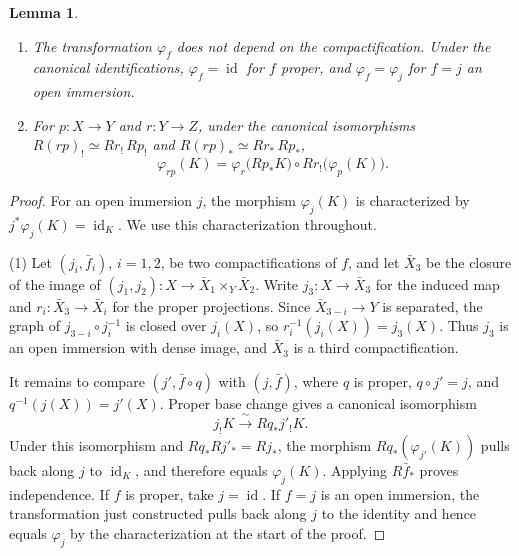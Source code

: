 \documentclass[12pt,reqno]{amsart}
\theoremstyle{definition}
\theoremstyle{plain}
\newtheorem{lem}[para]{Lemma}
\theoremstyle{definition}
\theoremstyle{remark}
\begin{document}
\begin{lem}
\label{lem:forget-supports}
\begin{enumerate}
\item The transformation \(\varphi_f\) does not depend on the compactification.  Under the canonical
identifications, \(\varphi_f=\operatorname{id}\) for \(f\) proper, and \(\varphi_f=\varphi_j\) for \(f=j\)
an open immersion.
\item For \(p\colon X\to Y\) and \(r\colon Y\to Z\), under the canonical isomorphisms
\(R(rp)_!\simeq Rr_!\,Rp_!\) and \(R(rp)_*\simeq Rr_*\,Rp_*\),
\[
        \varphi_{rp}(K)=\varphi_r\bigl(Rp_*K\bigr)\circ Rr_!\bigl(\varphi_p(K)\bigr).
\]
\end{enumerate}
\end{lem}

\begin{proof}
For an open immersion \(j\), the morphism \(\varphi_j(K)\) is characterized by
\(j^*\varphi_j(K)=\operatorname{id}_K\).  We use this characterization throughout.

(1)  Let \((j_i,\bar f_i)\), \(i=1,2\), be two compactifications of \(f\), and let \(\bar X_3\) be the
closure of the image of \((j_1,j_2)\colon X\to\bar X_1\times_Y\bar X_2\).  Write
\(j_3\colon X\to\bar X_3\) for the induced map and \(r_i\colon\bar X_3\to\bar X_i\) for the proper
projections.  Since \(\bar X_{3-i}\to Y\) is separated, the graph of
\(j_{3-i}\circ j_i^{-1}\) is closed over \(j_i(X)\), so
\(r_i^{-1}(j_i(X))=j_3(X)\).  Thus \(j_3\) is an open immersion with dense image, and \(\bar X_3\) is a
third compactification.

It remains to compare \((j',\bar f\circ q)\) with \((j,\bar f)\), where \(q\) is proper,
\(q\circ j'=j\), and \(q^{-1}(j(X))=j'(X)\).  Proper base change gives a canonical isomorphism
\[
        j_!K\xrightarrow{\ \sim\ }Rq_*j'_!K.
\]
Under this isomorphism and \(Rq_*Rj'_*=Rj_*\), the morphism \(Rq_*(\varphi_{j'}(K))\) pulls back along
\(j\) to \(\operatorname{id}_K\), and therefore equals \(\varphi_j(K)\).  Applying \(R\bar f_*\) proves
independence.  If \(f\) is proper, take \(j=\operatorname{id}\).  If \(f=j\) is an open immersion, the
transformation just constructed pulls back along \(j\) to the identity and hence equals \(\varphi_j\) by
the characterization at the start of the proof.


\end{proof}
\end{document}
